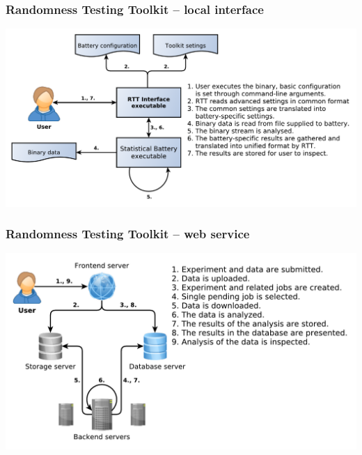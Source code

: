 \documentclass[aspectratio=169]{beamer}
\begin{document}
\begin{frame}
\frametitle{Randomness Testing Toolkit -- local interface}
\begin{nomar}
\centering
\includegraphics[width=\textwidth]{figures/local-rtt-workflow.pdf} 
\end{nomar}
\end{frame}

\begin{frame}
\frametitle{Randomness Testing Toolkit -- web service}
\begin{nomar}
\centering
\includegraphics[width=.9\textwidth]{figures/rtt-ecosystem.pdf} 
\end{nomar}
\end{frame}
\end{document}
